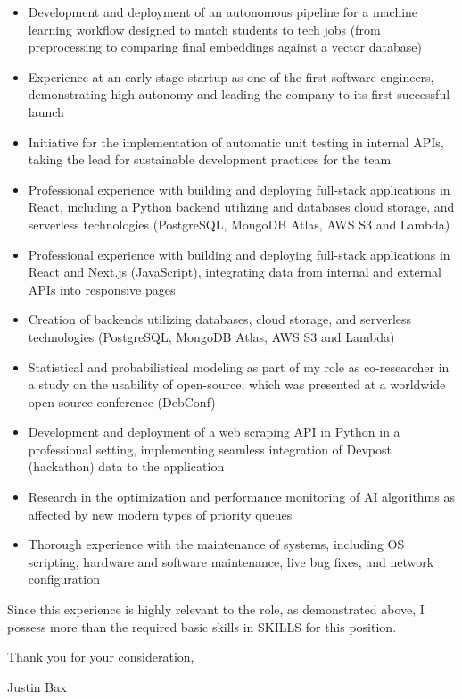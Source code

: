 \documentclass{article}
\begin{document}
\begin{itemize}
    \item Development and deployment of an autonomous pipeline for a machine learning workflow designed to match students to tech jobs (from preprocessing to comparing final embeddings against a vector database)
    \item Experience at an early-stage startup as one of the first software engineers, demonstrating high autonomy and leading the company to its first successful launch
    \item Initiative for the implementation of automatic unit testing in internal APIs, taking the lead for sustainable development practices for the team
    \item Professional experience with building and deploying full-stack applications in React, including a Python backend utilizing and databases cloud storage, and serverless technologies (PostgreSQL, MongoDB Atlas, AWS S3 and Lambda)
    \item Professional experience with building and deploying full-stack applications in React and Next.js (JavaScript), integrating data from internal and external APIs into responsive pages
    \item Creation of backends utilizing databases, cloud storage, and serverless technologies (PostgreSQL, MongoDB Atlas, AWS S3 and Lambda)
    \item Statistical and probabilistical modeling as part of my role as co-researcher in a study on the usability of open-source, which was presented at a worldwide open-source conference (DebConf)
    \item Development and deployment of a web scraping API in Python in a professional setting, implementing seamless integration of Devpost (hackathon) data to the application
    \item Research in the optimization and performance monitoring of AI algorithms as affected by new modern types of priority queues
    \item Thorough experience with the maintenance of systems, including OS scripting, hardware and software maintenance, live bug fixes, and network configuration

\end{itemize}

Since this experience is highly relevant to the role, as demonstrated above, I possess more than the required basic skills in SKILLS for this position.

\vspace{\baselineskip}

Thank you for your consideration,

Justin Bax
\end{document}
